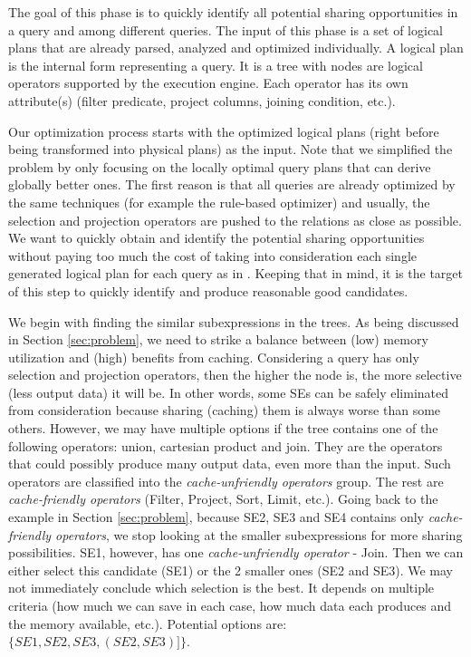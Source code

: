 The goal of this phase is to quickly identify all potential sharing opportunities in a query and among different queries. The input of this phase is a set of logical plans that are already parsed, analyzed and optimized individually. A logical plan is the internal form representing a query. It is a tree with nodes are logical operators supported by the execution engine. Each operator has its own attribute(s) (filter predicate, project columns, joining condition, etc.).

Our optimization process starts with the optimized logical plans (right before being transformed into physical plans) as the input. Note that we simplified the problem by only focusing on the locally optimal query plans that can derive globally better ones. The first reason is that all queries are already optimized by the same techniques (for example the rule-based optimizer) and usually, the selection and projection operators are pushed to the relations as close as possible. We want to quickly obtain and identify the potential sharing opportunities without paying too much the cost of taking into consideration each single generated logical plan for each query as in \cite{zhou2007efficient}. Keeping that in mind, it is the target of this step to quickly identify and produce reasonable good candidates.

We begin with finding the similar subexpressions in the trees. As being discussed in Section \ref{sec:problem}, we need to strike a balance between (low) memory utilization and (high) benefits from caching. Considering a query has only selection and projection operators, then the higher the node is, the more selective (less output data) it will be. In other words, some SEs can be safely eliminated from consideration because sharing (caching) them is always worse than some others. However, we may have multiple options if the tree contains one of the following operators: union, cartesian product and join. They are the operators that could possibly produce many output data, even more than the input. Such operators are classified into the \emph{cache-unfriendly operators} group. The rest are \emph{cache-friendly operators} (Filter, Project, Sort, Limit, etc.). Going back to the example in Section \ref{sec:problem}, because SE2, SE3 and SE4 contains only \emph{cache-friendly operators}, we stop looking at the smaller subexpressions for more sharing possibilities. SE1, however, has one \emph{cache-unfriendly operator} - Join. Then we can either select this candidate (SE1) or the 2 smaller ones (SE2 and SE3). We may not immediately conclude which selection is the best. It depends on multiple criteria (how much we can save in each case, how much data each produces and the memory available, etc.). Potential options are: $\{SE1, SE2, SE3, (SE2, SE3)]\}$.


